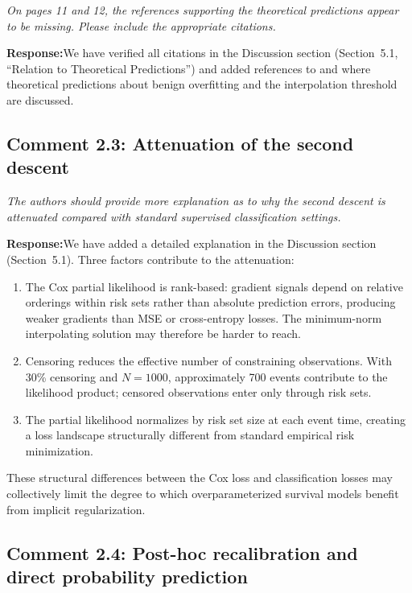 \documentclass[12pt,a4paper]{article}
\newcommand{\comment}[1]{%
  \begin{reviewerbox}
    \textit{#1}
  \end{reviewerbox}
}
\newcommand{\response}{\noindent\textbf{Response:}\quad}
\begin{document}
\comment{On pages 11 and 12, the references supporting the theoretical predictions appear to be missing. Please include the appropriate citations.}

\response We have verified all citations in the Discussion section (Section~5.1,
``Relation to Theoretical Predictions'') and added references to
\citet{bartlett2020benign} and \citet{hastie2022surprises} where theoretical
predictions about benign overfitting and the interpolation threshold are
discussed.


\bigskip

\subsection*{Comment 2.3: Attenuation of the second descent}

\comment{The authors should provide more explanation as to why the second descent is attenuated compared with standard supervised classification settings.}

\response We have added a detailed explanation in the Discussion section
(Section~5.1). Three factors contribute to the attenuation:

\begin{enumerate}
\item The Cox partial likelihood is rank-based: gradient signals depend on
relative orderings within risk sets rather than absolute prediction errors,
producing weaker gradients than MSE or cross-entropy losses. The
minimum-norm interpolating solution may therefore be harder to reach.

\item Censoring reduces the effective number of constraining observations.
With 30\% censoring and $N = 1000$, approximately 700 events contribute to
the likelihood product; censored observations enter only through risk sets.

\item The partial likelihood normalizes by risk set size at each event time,
creating a loss landscape structurally different from standard empirical risk
minimization.
\end{enumerate}

These structural differences between the Cox loss and classification losses
may collectively limit the degree to which overparameterized survival models
benefit from implicit regularization.


\bigskip

\subsection*{Comment 2.4: Post-hoc recalibration and direct probability prediction}
\end{document}
